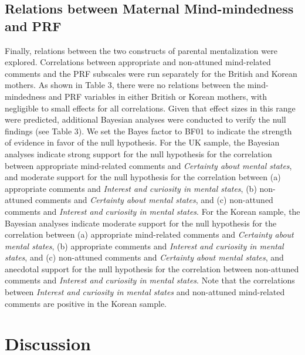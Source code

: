 \documentclass[
]{article}
\begin{document}
\hypertarget{relations-between-maternal-mind-mindedness-and-prf}{%
\subsection*{Relations between Maternal Mind-mindedness and PRF}\label{relations-between-maternal-mind-mindedness-and-prf}}

Finally, relations between the two constructs of parental mentalization were explored. Correlations between appropriate and non-attuned mind-related comments and the PRF subscales were run separately for the British and Korean mothers. As shown in Table 3, there were no relations between the mind-mindedness and PRF variables in either British or Korean mothers, with negligible to small effects for all correlations. Given that effect sizes in this range were predicted, additional Bayesian analyses were conducted to verify the null findings (see Table 3). We set the Bayes factor to BF01 to indicate the strength of evidence in favor of the null hypothesis. For the UK sample, the Bayesian analyses indicate strong support for the null hypothesis for the correlation between appropriate mind-related comments and \emph{Certainty about mental states}, and moderate support for the null hypothesis for the correlation between (a) appropriate comments and \emph{Interest and curiosity in mental states}, (b) non-attuned comments and \emph{Certainty about mental states}, and (c) non-attuned comments and \emph{Interest and curiosity in mental states}. For the Korean sample, the Bayesian analyses indicate moderate support for the null hypothesis for the correlation between (a) appropriate mind-related comments and \emph{Certainty about mental states}, (b) appropriate comments and \emph{Interest and curiosity in mental states}, and (c) non-attuned comments and \emph{Certainty about mental states}, and anecdotal support for the null hypothesis for the correlation between non-attuned comments and \emph{Interest and curiosity in mental states}. Note that the correlations between \emph{Interest and curiosity in mental states} and non-attuned mind-related comments are positive in the Korean sample.

\hypertarget{discussion}{%
\section*{Discussion}\label{discussion}}
\end{document}
